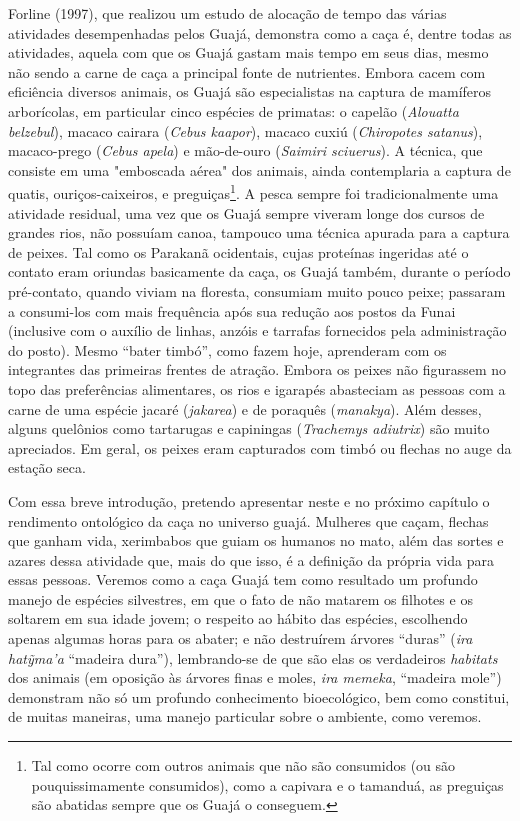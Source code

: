 Forline (1997), que realizou um estudo de alocação de tempo das várias
atividades desempenhadas pelos Guajá, demonstra como a caça é, dentre
todas as atividades, aquela com que os Guajá gastam mais tempo em seus
dias, mesmo não sendo a carne de caça a principal fonte de nutrientes.
Embora cacem com eficiência diversos animais, os Guajá são especialistas
na captura de mamíferos arborícolas, em particular cinco espécies de
primatas: o capelão (\emph{Alouatta belzebul}), macaco cairara
(\emph{Cebus kaapor}), macaco cuxiú (\emph{Chiropotes satanus}),
macaco-prego (\emph{Cebus apela}) e mão-de-ouro (\emph{Saimiri
sciuerus}). A técnica, que consiste em uma "emboscada aérea" dos
animais, ainda contemplaria a captura de quatis, ouriços-caixeiros, e
preguiças\footnote{Tal como ocorre com outros animais que não são
  consumidos (ou são pouquissimamente consumidos), como a capivara e o
  tamanduá, as preguiças são abatidas sempre que os Guajá o conseguem.}.
A pesca sempre foi tradicionalmente uma atividade residual, uma vez que
os Guajá sempre viveram longe dos cursos de grandes rios, não possuíam
canoa, tampouco uma técnica apurada para a captura de peixes. Tal como
os Parakanã ocidentais, cujas proteínas ingeridas até o contato eram
oriundas basicamente da caça, os Guajá também, durante o período
pré-contato, quando viviam na floresta, consumiam muito pouco peixe;
passaram a consumi-los com mais frequência após sua redução aos postos
da Funai (inclusive com o auxílio de linhas, anzóis e tarrafas
fornecidos pela administração do posto). Mesmo ``bater timbó'', como
fazem hoje, aprenderam com os integrantes das primeiras frentes de
atração. Embora os peixes não figurassem no topo das preferências
alimentares, os rios e igarapés abasteciam as pessoas com a carne de uma
espécie jacaré (\emph{jakarea}) e de poraquês (\emph{manakya}). Além
desses, alguns quelônios como tartarugas e capiningas (\emph{Trachemys
adiutrix}) são muito apreciados. Em geral, os peixes eram capturados com
timbó ou flechas no auge da estação seca.

Com essa breve introdução, pretendo apresentar neste e no próximo
capítulo o rendimento ontológico da caça no universo guajá. Mulheres que
caçam, flechas que ganham vida, xerimbabos que guiam os humanos no mato,
além das sortes e azares dessa atividade que, mais do que isso, é a
definição da própria vida para essas pessoas. Veremos como a caça Guajá
tem como resultado um profundo manejo de espécies silvestres, em que o
fato de não matarem os filhotes e os soltarem em sua idade jovem; o
respeito ao hábito das espécies, escolhendo apenas algumas horas para os
abater; e não destruírem árvores ``duras'' (\emph{ira hatỹma'a}
``madeira dura''), lembrando-se de que são elas os verdadeiros
\emph{habitats} dos animais (em oposição às árvores finas e moles,
\emph{ira memeka}, ``madeira mole'') demonstram não só um profundo
conhecimento bioecológico, bem como constitui, de muitas maneiras, uma
manejo particular sobre o ambiente, como veremos.


